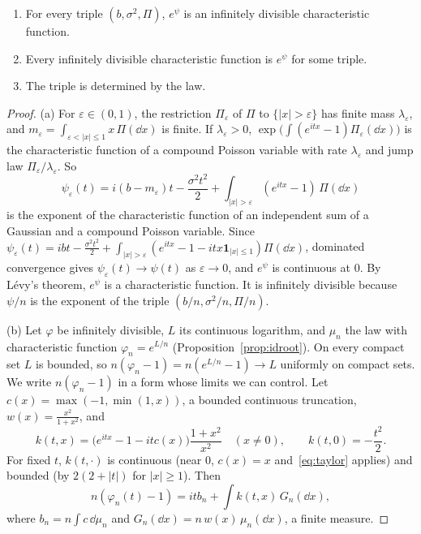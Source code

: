 \begin{theorem}\label{thm:lk}
\begin{enumerate}[label=(\alph*)]
\item For every triple $(b,\sigma^2,\Pi)$, $e^\psi$ is an infinitely divisible characteristic function.
\item Every infinitely divisible characteristic function is $e^\psi$ for some triple.
\item The triple is determined by the law.
\end{enumerate}
\end{theorem}
\begin{proof}
(a) For $\varepsilon\in(0,1)$, the restriction $\Pi_\varepsilon$ of $\Pi$ to $\{|x|>\varepsilon\}$ has finite mass $\lambda_\varepsilon$, and $m_\varepsilon=\int_{\varepsilon<|x|\le1}x\,\Pi(\dd x)$ is
finite. If $\lambda_\varepsilon>0$, $\exp\bigl(\int(e^{itx}-1)\Pi_\varepsilon(\dd x)\bigr)$ is the characteristic function of a compound Poisson variable with rate
$\lambda_\varepsilon$ and jump law $\Pi_\varepsilon/\lambda_\varepsilon$. So
\[
\psi_\varepsilon(t)=i(b-m_\varepsilon)t-\frac{\sigma^2t^2}2+\int_{|x|>\varepsilon}(e^{itx}-1)\,\Pi(\dd x)
\]
is the exponent of the characteristic function of an independent sum of a Gaussian and a compound Poisson variable. Since $\psi_\varepsilon(t)=ibt-\frac{\sigma^2t^2}2+\int_{|x|>\varepsilon}(e^{itx}-1-itx\mathbf 1_{|x|\le1})\Pi(\dd x)$, dominated convergence gives
$\psi_\varepsilon(t)\to\psi(t)$ as $\varepsilon\to0$, and
$e^\psi$ is continuous at $0$. By L\'evy's theorem, $e^\psi$ is a characteristic function. It is infinitely divisible because $\psi/n$ is the exponent of the triple
$(b/n,\sigma^2/n,\Pi/n)$.

(b) Let $\varphi$ be infinitely divisible, $L$ its continuous logarithm, and $\mu_n$ the law with characteristic function $\varphi_n=e^{L/n}$
(Proposition~\ref{prop:idroot}). On every compact set $L$ is bounded, so $n(\varphi_n-1)=n(e^{L/n}-1)\to L$ uniformly on compact sets. We write
$n(\varphi_n-1)$ in a form whose limits we can control. Let $c(x)=\max(-1,\min(1,x))$, a bounded continuous truncation, $w(x)=\frac{x^2}{1+x^2}$, and
\[
k(t,x)=\bigl(e^{itx}-1-itc(x)\bigr)\frac{1+x^2}{x^2}\quad(x\ne0),\qquad k(t,0)=-\frac{t^2}2.
\]
For fixed $t$, $k(t,\cdot)$ is continuous (near $0$, $c(x)=x$ and~\eqref{eq:taylor} applies) and bounded (by $2(2+|t|)$ for $|x|\ge1$). Then
\begin{equation}\label{eq:khintchine}
n(\varphi_n(t)-1)=itb_n+\int k(t,x)\,G_n(\dd x),
\end{equation}
where $b_n=n\int c\,\dd\mu_n$ and $G_n(\dd x)=n\,w(x)\,\mu_n(\dd x)$, a finite measure.


\end{proof}
